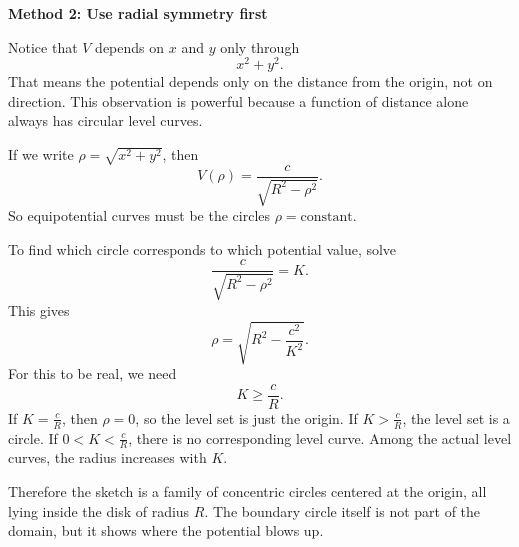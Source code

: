 \documentclass[a4paper,12pt,twocolumn]{article}
\newenvironment{solutionbox}{\begin{framed}}{\end{framed}}
\begin{document}
\begin{solutionbox}
\textbf{Method 2: Use radial symmetry first}

\begin{steps}
\item Notice that \(V\) depends on \(x\) and \(y\) only through
\[
x^2+y^2.
\]
That means the potential depends only on the distance from the origin, not on direction. This observation is powerful because a function of distance alone always has circular level curves.

\item If we write \(\rho=\sqrt{x^2+y^2}\), then
\[
V(\rho)=\frac{c}{\sqrt{R^2-\rho^2}}.
\]
So equipotential curves must be the circles \(\rho=\text{constant}\).

\item To find which circle corresponds to which potential value, solve
\[
\frac{c}{\sqrt{R^2-\rho^2}}=K.
\]
This gives
\[
\rho=\sqrt{R^2-\frac{c^2}{K^2}}.
\]
For this to be real, we need
\[
K\ge \frac{c}{R}.
\]
If \(K=\frac{c}{R}\), then \(\rho=0\), so the level set is just the origin. If \(K>\frac{c}{R}\), the level set is a circle. If \(0<K<\frac{c}{R}\), there is no corresponding level curve. Among the actual level curves, the radius increases with \(K\).

\item Therefore the sketch is a family of concentric circles centered at the origin, all lying inside the disk of radius \(R\). The boundary circle itself is not part of the domain, but it shows where the potential blows up.
\end{steps}
\end{solutionbox}
\end{document}
